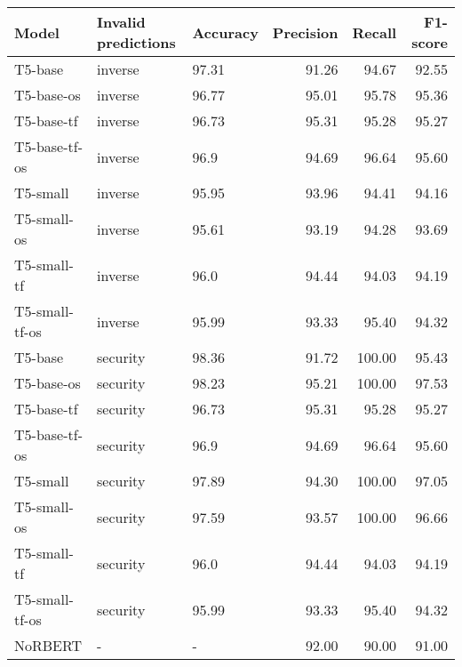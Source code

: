 \begin{tabular}{lllrrr}
\toprule
         Model & Invalid predictions & Accuracy &  Precision &  Recall &  F1-score \\
\midrule
       T5-base &             inverse &    97.31 &      91.26 &   94.67 &     92.55 \\
    T5-base-os &             inverse &    96.77 &      95.01 &   95.78 &     95.36 \\
    T5-base-tf &             inverse &    96.73 &      95.31 &   95.28 &     95.27 \\
 T5-base-tf-os &             inverse &     96.9 &      94.69 &   96.64 &     95.60 \\
      T5-small &             inverse &    95.95 &      93.96 &   94.41 &     94.16 \\
   T5-small-os &             inverse &    95.61 &      93.19 &   94.28 &     93.69 \\
   T5-small-tf &             inverse &     96.0 &      94.44 &   94.03 &     94.19 \\
T5-small-tf-os &             inverse &    95.99 &      93.33 &   95.40 &     94.32 \\
       T5-base &            security &    98.36 &      91.72 &  100.00 &     95.43 \\
    T5-base-os &            security &    98.23 &      95.21 &  100.00 &     97.53 \\
    T5-base-tf &            security &    96.73 &      95.31 &   95.28 &     95.27 \\
 T5-base-tf-os &            security &     96.9 &      94.69 &   96.64 &     95.60 \\
      T5-small &            security &    97.89 &      94.30 &  100.00 &     97.05 \\
   T5-small-os &            security &    97.59 &      93.57 &  100.00 &     96.66 \\
   T5-small-tf &            security &     96.0 &      94.44 &   94.03 &     94.19 \\
T5-small-tf-os &            security &    95.99 &      93.33 &   95.40 &     94.32 \\
       NoRBERT &                   - &        - &      92.00 &   90.00 &     91.00 \\
\bottomrule
\end{tabular}
